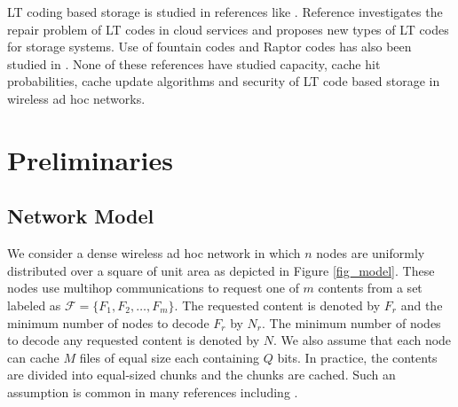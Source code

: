 \documentclass[10pt,journal]{IEEEtran}
\begin{document}
LT coding based storage is studied in references like \cite{DBLP:conf/infocom/CaoYYLH12,wang2012lt}. Reference \cite{DBLP:conf/infocom/CaoYYLH12} investigates the repair problem of LT codes in cloud services and \cite{wang2012lt} proposes new types of LT codes for storage systems. Use of fountain codes and Raptor codes \cite{DBLP:journals/tit/Shokrollahi06} has also been studied in  \cite{DBLP:conf/icassp/DimakisPR06,DBLP:journals/jsac/KongAS10}. None of these references have studied capacity, cache hit probabilities, cache update algorithms and security of LT code based storage in wireless ad hoc networks.


\section{Preliminaries}
\label{netmod}
\subsection{Network Model}
We consider a dense wireless ad hoc network in which $n$ nodes are uniformly distributed over a square of unit area as depicted in Figure \ref{fig_model}. These nodes use multihop communications to request one of $m$ contents from a set labeled as  $\mathcal{F}=\{F_1,F_2,\dots,F_m\}$. The requested content is denoted by $F_r$ and the minimum  number of nodes to decode $F_r$ by $N_r$. The minimum number of nodes to decode any requested content is denoted by $N$. We also assume that each node can cache $M$ files of equal size each containing $Q$ bits. In practice, the contents are divided into equal-sized chunks and the chunks are cached. Such an assumption is common in many references including \cite{DBLP:journals/tit/Maddah-AliN14, DBLP:journals/tvt/KiskaniS17, DBLP:journals/ton/Maddah-AliN15}.


\end{document}
